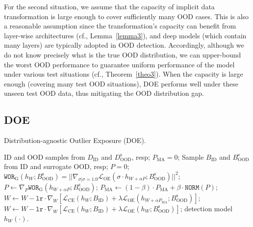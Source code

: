 \documentclass{article} \usepackage{iclr2022_conference,times}
\begin{document}
{For the second situation, we assume that the capacity of implicit data transformation is large enough to cover sufficiently many OOD cases. This is also a reasonable assumption since the transformation's capacity can benefit from layer-wise architectures (cf., Lemma~\ref{lemma3}), and deep models (which contain many layers) are typically adopted in OOD detection. Accordingly, although we do not know precisely what is the true OOD distribution, we can upper-bound the worst OOD performance to guarantee uniform performance of the model under various test situations (cf., Theorem~\ref{theo3}). When the capacity is large enough (covering many test OOD situations), DOE performs well under these unseen test OOD data, thus mitigating the OOD distribution gap.}

\subsection{DOE}
\begin{algorithm}[!t]
   \caption{Distribution-agnostic Outlier Exposure (DOE).}
   \label{alg: DOE}
\begin{algorithmic}
   ID and OOD samples from $D_\text{ID}$ and $D^\text{s}_\text{OOD}$, resp;
  \STATE $P_\text{MA} = 0$;
  \STATE Sample $B_\text{ID}$ and $B^\text{s}_\text{OOD}$ from ID and surrogate OOD, resp;
  \STATE $P = 0$;
            \STATE ${\texttt{WOR}}_\text{G}(h_{W}; B_\text{OOD}^\text{s}) = \lvert\lvert\nabla_{\sigma | \sigma = 1.0} \mathcal{L}_\text{OE}( \sigma \cdot h_{W+ \alpha P}; B^\text{s}_\text{OOD})  \rvert\rvert^2$;
            \STATE ${P} \leftarrow \nabla_{P} {\texttt{WOR}}_\text{G}(h_{W + \alpha P}; B_\text{OOD}^\text{s})$;
        \ENDFOR
        \STATE ${P}_\text{MA} \leftarrow (1-\beta) \cdot {P}_\text{MA} + \beta \cdot \texttt{NORM}({P})$;
        \STATE ${W}\leftarrow {W} - \texttt{lr} \cdot \nabla_{W} \left[{\mathcal{L}}_\text{CE}(h_{W}; B_\text{ID}) + \lambda {\mathcal{L}}_\text{OE}(h_{{W} + \alpha {P}_\text{MA}}; B^\text{s}_\text{OOD})\right]$;
    \ELSE
        \STATE ${W}\leftarrow {W} - \texttt{lr} \cdot \nabla_{W} \left[{\mathcal{L}}_\text{CE}(h_{W}; B_\text{ID}) + \lambda {\mathcal{L}}_\text{OE}(h_{{W}}; B^\text{s}_\text{OOD})\right]$;
    \ENDIF
 \ENDFOR
  detection model $h_W(\cdot)$.
\end{algorithmic}
\end{algorithm}
\end{document}
